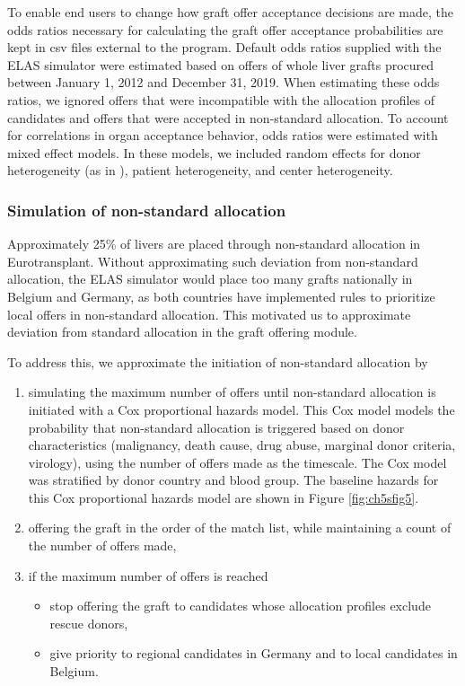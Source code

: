 \documentclass[11pt,twoside,]{book}
\begin{document}
To enable end users to change how graft offer acceptance decisions are
made, the odds ratios necessary for calculating the graft offer acceptance
probabilities are kept in csv files external to the program. Default
odds ratios supplied with the ELAS simulator were estimated based on
offers of whole liver grafts procured between January 1, 2012 and December 31, 2019.
When estimating these odds ratios, we ignored offers that were incompatible with
the allocation profiles of candidates and offers that were accepted
in non-standard allocation. To account for correlations in organ
acceptance behavior, odds ratios were estimated with mixed effect models. In these
models, we included random effects for donor heterogeneity (as in
\citep{agarwalEquilibriumAllocationsAlternative2021}), patient heterogeneity,
and center heterogeneity.

\subsubsection{Simulation of non-standard allocation}\label{sec:nonstandardalloc}

Approximately 25\% of livers are placed through non-standard allocation in
Eurotransplant. Without approximating such deviation from non-standard allocation,
the ELAS simulator would place too many grafts nationally in Belgium and Germany,
as both countries have implemented rules to prioritize local offers in
non-standard allocation. This motivated us to approximate deviation from standard allocation in the
graft offering module.

To address this, we approximate the initiation of non-standard allocation by

\begin{enumerate}
\def\labelenumi{\arabic{enumi}.}
\item
  simulating the maximum number of offers until non-standard allocation
  is initiated with a Cox proportional hazards model. This Cox model models
  the probability that non-standard allocation is triggered based on
  donor characteristics (malignancy, death cause, drug abuse, marginal
  donor criteria, virology), using the number of offers made as the timescale.
  The Cox model was stratified by donor country
  and blood group. The baseline hazards
  for this Cox proportional hazards model are shown in Figure \ref{fig:ch5sfig5}.
\item
  offering the graft in the order of the match list, while maintaining a
  count of the number of offers made,
\item
  if the maximum number of offers is reached

  \begin{itemize}
  \item
    stop offering the graft to candidates whose allocation
    profiles exclude rescue donors,
  \item
    give priority to regional candidates in Germany and
    to local candidates in Belgium.
  \end{itemize}
\end{enumerate}
\end{document}
